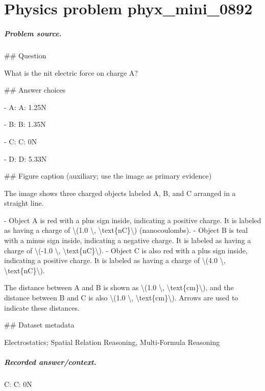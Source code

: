 
\chapter{Physics problem phyx\_mini\_0892}
\label{ch:PhyXMiniProblems_problem_phyx_mini_0892}

\paragraph{Problem source.}
\#\# Question

What is the nit electric force on charge A?

\#\# Answer choices

- A: A: 1.25N

- B: B: 1.35N

- C: C: 0N

- D: D: 5.33N

\#\# Figure caption (auxiliary; use the image as primary evidence)

The image shows three charged objects labeled A, B, and C arranged in a straight line. 

- Object A is red with a plus sign inside, indicating a positive charge. It is labeled as having a charge of \textbackslash{}(1.0 \textbackslash{}, \textbackslash{}text\{nC\}\textbackslash{}) (nanocoulombs).
- Object B is teal with a minus sign inside, indicating a negative charge. It is labeled as having a charge of \textbackslash{}(-1.0 \textbackslash{}, \textbackslash{}text\{nC\}\textbackslash{}).
- Object C is also red with a plus sign inside, indicating a positive charge. It is labeled as having a charge of \textbackslash{}(4.0 \textbackslash{}, \textbackslash{}text\{nC\}\textbackslash{}).

The distance between A and B is shown as \textbackslash{}(1.0 \textbackslash{}, \textbackslash{}text\{cm\}\textbackslash{}), and the distance between B and C is also \textbackslash{}(1.0 \textbackslash{}, \textbackslash{}text\{cm\}\textbackslash{}). Arrows are used to indicate these distances.

\#\# Dataset metadata

Electrostatics; Spatial Relation Reasoning, Multi-Formula Reasoning

\paragraph{Recorded answer/context.}
C: C: 0N

